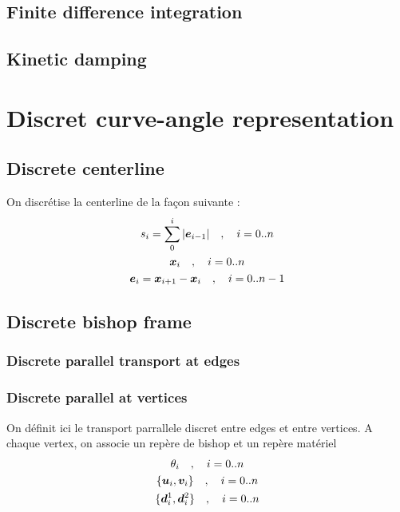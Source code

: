\subsection{Finite difference integration}

\subsection{Kinetic damping}


\section{Discret curve-angle representation}

\subsection{Discrete centerline}
On discrétise la centerline de la façon suivante :
\begin{subequations}
	\begin{gather}
		s_i = \sum\limits_0^i |\boldsymbol{e}_{i-1}|  \quad , \quad i=0..n \\
		\boldsymbol{x}_i \quad , \quad i=0..n \\
		\boldsymbol{e}_i = \boldsymbol{x}_{i+1}-\boldsymbol{x}_i \quad , \quad i=0..n-1
	\end{gather}
\end{subequations}

\subsection{Discrete bishop frame}

\subsubsection{Discrete parallel transport at edges}

\subsubsection{Discrete parallel at vertices}

On définit ici le transport parrallele discret entre edges et entre vertices.
A chaque vertex, on associe un repère de bishop et un repère matériel
\begin{subequations}
	\begin{gather}
		\theta_i \quad , \quad i=0..n \\
		\{\boldsymbol{u}_i, \boldsymbol{v}_i\} \quad , \quad i=0..n \\
		\{\boldsymbol{d}^1_{i}, \boldsymbol{d}^2_{i}\} \quad , \quad i=0..n
	\end{gather}
\end{subequations}

